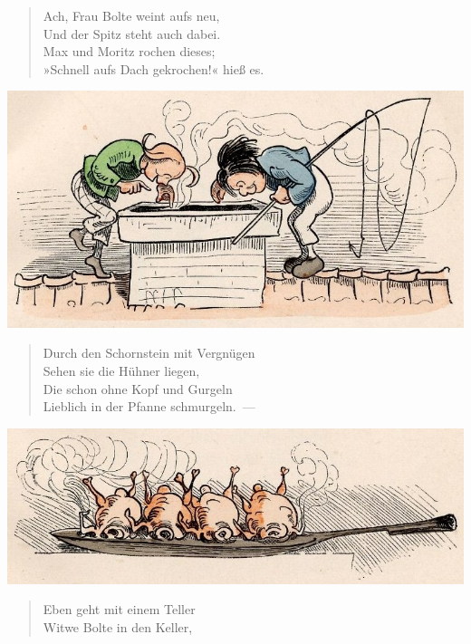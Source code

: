 \documentclass[a4paper,12pt]{article}
\begin{document}
\begin{verse}
Ach, Frau Bolte weint aufs neu,\\{}
Und der Spitz steht auch dabei.\\{}
Max und Moritz rochen dieses;\\{}
»Schnell aufs Dach gekrochen!« hieß es.
\end{verse}



\begin{center}\includegraphics[scale=.7, alt={Max und Moritz auf dem Dach}]{images/2-02.jpg}\end{center}



\begin{verse}
Durch den Schornstein mit Vergnügen\\{}
Sehen sie die Hühner liegen,\\{}
Die schon ohne Kopf und Gurgeln\\{}
Lieblich in der Pfanne schmurgeln.~—
\end{verse}



\begin{center}\includegraphics[scale=.7, alt={die Hühner in der Pfanne}]{images/2-03.jpg}\end{center}



\begin{verse}
Eben geht mit einem Teller\\{}
Witwe Bolte in den Keller,
\end{verse}
\end{document}
